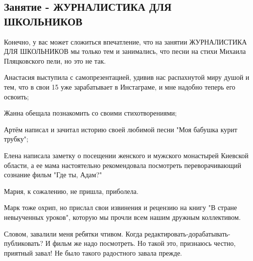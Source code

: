  
 
 

\subsection{Занятие - ЖУРНАЛИСТИКА ДЛЯ ШКОЛЬНИКОВ}
\label{sec:07_11_2020.fb.roman_barashev.1.zhurnalistika}

Конечно, у вас может сложиться впечатление, что на занятии ЖУРНАЛИСТИКА ДЛЯ
ШКОЛЬНИКОВ мы только тем и занимались, что песни на стихи Михаила Пляцковского
пели, но это не так.

Анастасия выступила с самопрезентацией, удивив нас распахнутой миру душой и
тем, что в свои 15 уже зарабатывает в Инстаграме, и мне надобно теперь его
освоить;

Жанна обещала познакомить со своими стихотворениями;

Артём написал и зачитал историю своей любимой песни "Моя бабушка курит трубку";

Елена написала заметку о посещении женского и мужского монастырей Киевской
области, а ее мама настоятельно рекомендовала посмотреть переворачивающий
сознание фильм "Где ты, Адам?"

Мария, к сожалению, не пришла, приболела.

Марк тоже охрип, но прислал свои извинения и рецензию на книгу "В стране
невыученных уроков", которую мы прочли всем нашим дружным коллективом.

Словом, завалили меня ребятки чтивом. Когда
редактировать-дорабатывать-публиковать? И фильм же надо посмотреть.  Но такой
это, признаюсь честно, приятный завал! Не было такого радостного завала прежде.
